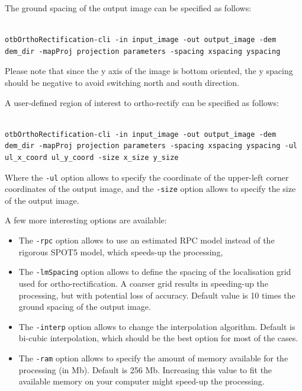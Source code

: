 The ground spacing of the output image can be specified as follows:

\begin{verbatim}

otbOrthoRectification-cli -in input_image -out output_image -dem
dem_dir -mapProj projection parameters -spacing xspacing yspacing

\end{verbatim}

Please note that since the y axis of the image is bottom oriented, the
y spacing should be negative to avoid switching north and south direction.

A user-defined region of interest to ortho-rectify can be specified as
follows:

\begin{verbatim}

otbOrthoRectification-cli -in input_image -out output_image -dem
dem_dir -mapProj projection parameters -spacing xspacing yspacing -ul
ul_x_coord ul_y_coord -size x_size y_size

\end{verbatim}

Where the \verb?-ul? option allows to specify the coordinate of the
upper-left corner coordinates of the output image, and the
\verb?-size? option allows to specify the size of the output image.

A few more interesting options are available:
\begin{itemize}
\item The \verb?-rpc? option allows to use an estimated RPC model
  instead of the rigorous SPOT5 model, which speeds-up the processing,
\item The \verb?-lmSpacing? option allows to define the spacing of the
  localisation grid used for ortho-rectification. A coarser grid
  results in speeding-up the processing, but with potential loss of
  accuracy. Default value is 10 times the ground spacing of the output
  image.
\item The \verb?-interp? option allows to change the interpolation
  algorithm. Default is bi-cubic interpolation, which should be the
  best option for most of the cases.
\item The \verb?-ram? option allows to specify the amount of memory
  available for the processing (in Mb). Default is 256 Mb. Increasing
  this value to fit the available memory on your computer might
  speed-up the processing.
\end{itemize}


